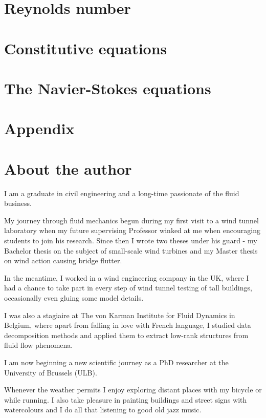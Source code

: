 \documentclass[10pt]{report}
\begin{document}
\chapter{Reynolds number}



\chapter{Constitutive equations}

\chapter{The Navier-Stokes equations}



\chapter*{Appendix}

\newpage
\thispagestyle{empty}

\chapter*{About the author}

I am a graduate in civil engineering and a long-time passionate of the fluid business. 

My journey through fluid mechanics begun during my first visit to a wind tunnel laboratory when my future supervising Professor winked at me when encouraging students to join his research. Since then I wrote two theses under his guard - my Bachelor thesis on the subject of small-scale wind turbines and my Master thesis on wind action causing bridge flutter.

In the meantime, I worked in a wind engineering company in the UK, where I had a chance to take part in every step of wind tunnel testing of tall buildings, occasionally even gluing some model details.

I was also a stagiaire at The von Karman Institute for Fluid Dynamics in Belgium, where apart from falling in love with French language, I studied data decomposition methods and applied them to extract low-rank structures from fluid flow phenomena.

I am now beginning a new scientific journey as a PhD researcher at the University of Brussels (ULB).

Whenever the weather permits I enjoy exploring distant places with my bicycle or while running. I also take pleasure in painting buildings and street signs with watercolours and I do all that listening to good old jazz music.
\end{document}
